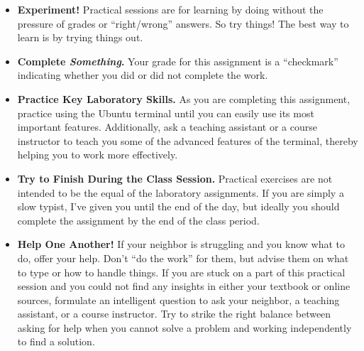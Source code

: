     
\begin{itemize}
\item {\bf Experiment!} Practical sessions are for learning by doing without the pressure of grades or ``right/wrong''
  answers. So try things!  The best way to learn is by trying things out.

\item {\bf Complete \textbf{\textit{Something}}.} Your grade for this assignment is a ``checkmark'' indicating whether you
  did or did not complete the work.

\item {\bf Practice Key Laboratory Skills.} As you are completing this assignment, practice using the Ubuntu terminal until you can easily use its most important features.  Additionally, ask
  a teaching assistant or a course instructor to teach you some of the advanced features of the terminal, thereby helping you to work more effectively. 

\item {\bf Try to Finish During the Class Session.} Practical exercises are not intended to be the equal of the
  laboratory assignments. If you are simply a slow typist, I've given you until the end of the day, but ideally you
  should complete the assignment by the end of the class period. 

\item {\bf Help One Another!} If your neighbor is struggling and you know what to do, offer your help. Don't ``do the
  work'' for them, but advise them on what to type or how to handle things. If you are stuck on a part of this practical
  session and you could not find any insights in either your textbook or online sources, formulate an intelligent
  question to ask your neighbor, a teaching assistant, or a course instructor. Try to strike the right balance between
  asking for help when you cannot solve a problem and working independently to find a solution.
\end{itemize}


